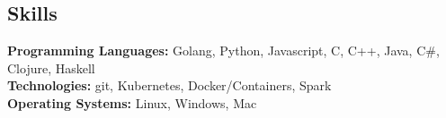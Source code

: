 \documentclass[margin,line]{resume}
\begin{document}
\begin{resume}

\filbreak
\section{\mysidestyle Skills}
\textbf{Programming Languages:} Golang, Python, Javascript, C, C++, Java, C\#, Clojure,
Haskell\\
\textbf{Technologies:} git, Kubernetes, Docker/Containers, Spark\\
\textbf{Operating Systems:} Linux, Windows, Mac




\end{resume}
\end{document}
